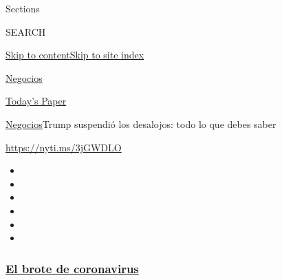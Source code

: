 Sections

SEARCH

\protect\hyperlink{site-content}{Skip to
content}\protect\hyperlink{site-index}{Skip to site index}

\href{https://www.nytimes3xbfgragh.onion/es/section/negocios}{Negocios}

\href{https://myaccount.nytimes3xbfgragh.onion/auth/login?response_type=cookie\&client_id=vi}{}

\href{https://www.nytimes3xbfgragh.onion/section/todayspaper}{Today's
Paper}

\href{/es/section/negocios}{Negocios}\textbar{}Trump suspendió los
desalojos: todo lo que debes saber

\url{https://nyti.ms/3jGWDLO}

\begin{itemize}
\item
\item
\item
\item
\item
\item
\end{itemize}

\hypertarget{el-brote-de-coronavirus}{%
\subsubsection{\texorpdfstring{\href{https://www.nytimes3xbfgragh.onion/es/spotlight/coronavirus?name=styln-coronavirus-es\&region=TOP_BANNER\&block=storyline_menu_recirc\&action=click\&pgtype=Article\&impression_id=3017e560-f2bb-11ea-8c2a-475020e0db7d\&variant=undefined}{El
brote de
coronavirus}}{El brote de coronavirus}}\label{el-brote-de-coronavirus}}

